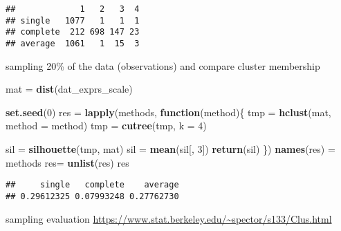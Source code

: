 \documentclass[]{article}
\newenvironment{Shaded}{\begin{snugshade}}{\end{snugshade}}
\newcommand{\KeywordTok}[1]{\textcolor[rgb]{0.13,0.29,0.53}{\textbf{#1}}}
\newcommand{\DataTypeTok}[1]{\textcolor[rgb]{0.13,0.29,0.53}{#1}}
\newcommand{\DecValTok}[1]{\textcolor[rgb]{0.00,0.00,0.81}{#1}}
\newcommand{\StringTok}[1]{\textcolor[rgb]{0.31,0.60,0.02}{#1}}
\newcommand{\ControlFlowTok}[1]{\textcolor[rgb]{0.13,0.29,0.53}{\textbf{#1}}}
\newcommand{\NormalTok}[1]{#1}
\begin{document}
\begin{verbatim}
##             1   2   3  4
## single   1077   1   1  1
## complete  212 698 147 23
## average  1061   1  15  3
\end{verbatim}

sampling 20\% of the data (observations) and compare cluster membership

\begin{Shaded}
\begin{Highlighting}[]
\NormalTok{mat =}\StringTok{ }\KeywordTok{dist}\NormalTok{(dat_exprs_scale)}

\KeywordTok{set.seed}\NormalTok{(}\DecValTok{0}\NormalTok{)}
\NormalTok{res =}\StringTok{ }\KeywordTok{lapply}\NormalTok{(methods, }\ControlFlowTok{function}\NormalTok{(method)\{}
\NormalTok{    tmp =}\StringTok{ }\KeywordTok{hclust}\NormalTok{(mat, }\DataTypeTok{method =}\NormalTok{ method)}
\NormalTok{    tmp =}\StringTok{ }\KeywordTok{cutree}\NormalTok{(tmp, }\DataTypeTok{k =} \DecValTok{4}\NormalTok{)}
    
\NormalTok{    sil =}\StringTok{ }\KeywordTok{silhouette}\NormalTok{(tmp, mat)}
\NormalTok{    sil =}\StringTok{ }\KeywordTok{mean}\NormalTok{(sil[, }\DecValTok{3}\NormalTok{])}
    \KeywordTok{return}\NormalTok{(sil)}
\NormalTok{\})}
\KeywordTok{names}\NormalTok{(res) =}\StringTok{ }\NormalTok{methods}
\NormalTok{res=}\StringTok{ }\KeywordTok{unlist}\NormalTok{(res)}
\NormalTok{res}
\end{Highlighting}
\end{Shaded}

\begin{verbatim}
##     single   complete    average 
## 0.29612325 0.07993248 0.27762730
\end{verbatim}

sampling evaluation
\url{https://www.stat.berkeley.edu/~spector/s133/Clus.html}
\end{document}
